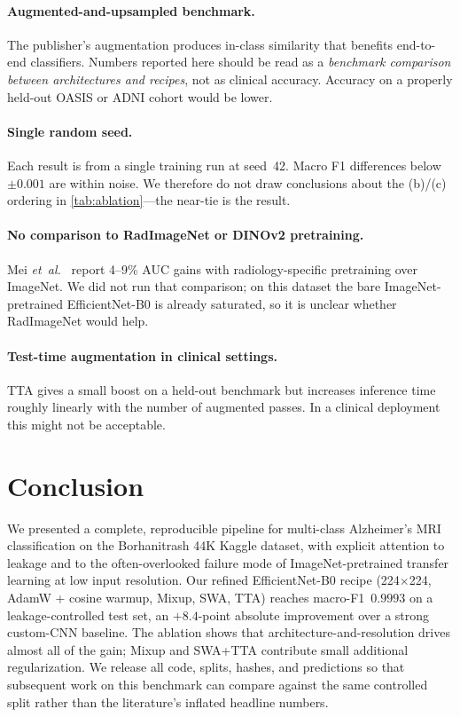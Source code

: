 \documentclass[journal,onecolumn,11pt]{IEEEtran}
\begin{document}
\paragraph{Augmented-and-upsampled benchmark.}
The publisher's augmentation produces in-class similarity that benefits
end-to-end classifiers. Numbers reported here should be read as a
\emph{benchmark comparison between architectures and recipes}, not as
clinical accuracy. Accuracy on a properly held-out OASIS or ADNI cohort
would be lower.

\paragraph{Single random seed.}
Each result is from a single training run at seed~42. Macro F1
differences below $\pm 0.001$ are within noise. We therefore do not
draw conclusions about the (b)/(c) ordering in \cref{tab:ablation}---the
near-tie is the result.

\paragraph{No comparison to RadImageNet or DINOv2 pretraining.}
Mei \textit{et~al.}~\cite{mei2022radimagenet} report 4--9\% AUC gains with
radiology-specific pretraining over ImageNet. We did not run that
comparison; on this dataset the bare ImageNet-pretrained EfficientNet-B0
is already saturated, so it is unclear whether RadImageNet would help.

\paragraph{Test-time augmentation in clinical settings.}
TTA gives a small boost on a held-out benchmark but increases inference
time roughly linearly with the number of augmented passes. In a clinical
deployment this might not be acceptable.

\section{Conclusion}
\label{sec:conclusion}

We presented a complete, reproducible pipeline for multi-class Alzheimer's
MRI classification on the Borhanitrash 44K Kaggle dataset, with explicit
attention to leakage and to the often-overlooked failure mode of
ImageNet-pretrained transfer learning at low input resolution. Our refined
EfficientNet-B0 recipe (224$\times$224, AdamW + cosine warmup, Mixup, SWA,
TTA) reaches macro-F1~$0.9993$ on a leakage-controlled test set, an
$+8.4$-point absolute improvement over a strong custom-CNN baseline. The
ablation shows that architecture-and-resolution drives almost all of the
gain; Mixup and SWA+TTA contribute small additional regularization. We
release all code, splits, hashes, and predictions so that subsequent work
on this benchmark can compare against the same controlled split rather
than the literature's inflated headline numbers.



\end{document}
